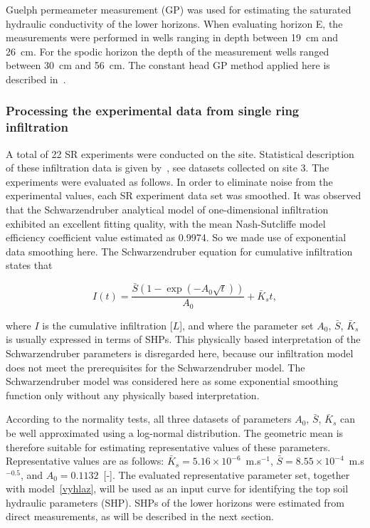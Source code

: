 \documentclass[review]{myarticle}
\newenvironment{lineq}
    {\begin{linenomath*}
    \begin{equation}
    }
    { 
    \end{equation} 
    \end{linenomath*}
    }
\begin{document}
Guelph permeameter measurement (GP) was used for estimating the saturated hydraulic conductivity of the lower horizons. When evaluating horizon E, the measurements were performed in wells ranging in depth between 19~cm  and 26~cm. For the spodic horizon the depth of the measurement wells ranged between 30~cm  and 56~cm. The constant head GP method applied here is described in~\citep{Jacka1}.

\subsubsection{Processing the experimental data from single ring infiltration}
\label{krivka}

A total of 22 SR experiments were conducted on the site. Statistical description of these infiltration data is given by~\citep{jacka-site}, see datasets collected on site 3. The experiments were evaluated as follows. In order to eliminate noise from the experimental values, each SR experiment data set was smoothed. It was observed that the Schwarzendruber analytical model of one-dimensional infiltration exhibited an excellent fitting quality, with the mean  Nash-Sutcliffe model efficiency coefficient value estimated as 0.9974. So we made use of  exponential data smoothing here. The Schwarzendruber equation for cumulative infiltration  states that
\begin{lineq}
I(t)=\frac{\bar{S}\left(1-\exp\left(-A_0\sqrt{t}\right)\right)}{A_0}+\bar{K}_{s}t,
\label{vyhlaz}
\end{lineq}
where $I$ is the cumulative infiltration [$L$], and where the parameter set $A_0$, $\bar{S}$, $\bar{K}_{s}$ is usually expressed in terms of SHPs. This physically based interpretation of the Schwarzendruber parameters is disregarded here, because our infiltration model does not meet the prerequisites for the Schwarzendruber model. The Schwarzendruber model was  considered here as some exponential smoothing function only without any physically  based interpretation.


According to the normality tests,  all three datasets of  parameters $A_0$, $\bar{S}$, $\bar{K}_{s}$ can be well approximated  using a log-normal distribution. The geometric mean is therefore suitable for estimating representative values of these parameters. Representative values are as follows: $\bar{K}_s = 5.16\times 10^{-6}$~m.s$^{-1}$, $\bar{S} = 8.55\times 10^{-4}$~m.s$^{-0.5}$, and $A_0 = 0.1132$~[-]. The evaluated representative  parameter set, together with  model~\eqref{vyhlaz}, will be used as an input curve for identifying the top soil hydraulic parameters (SHP). SHPs of the lower horizons were estimated from direct measurements, as will be described in the next section.
\end{document}
